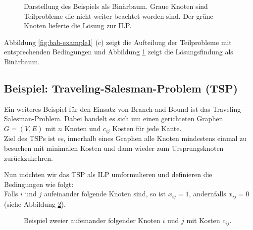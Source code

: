 \documentclass[tog]{acmsiggraph}
\begin{document}
\begin{figure}[ht]
\centering
{}
\caption{Darstellung des Beispiels als Binärbaum. Graue Knoten sind Teilprobleme die nicht weiter beachtet worden sind. Der grüne Knoten lieferte die Lösung zur ILP.}
\label{fig:Branch-And-Bound-Bsp1}
\end{figure}

Abbildung \ref{fig:bab-example1} (c) zeigt die Aufteilung der Teilprobleme mit entsprechenden Bedingungen und Abbildung \ref{fig:Branch-And-Bound-Bsp1} zeigt die Lösungsfindung als Binärbaum.

\subsection*{Beispiel: Traveling-Salesman-Problem (TSP)} 

Ein weiteres Beispiel für den Einsatz von Branch-and-Bound ist das Traveling-Salesman-Problem. Dabei handelt es sich um einen gerichteten Graphen $G = (V,E)$ mit $n$ Knoten und $c_{ij}$ Kosten für jede Kante.\\
Ziel des TSPs ist es, innerhalb eines Graphen alle Knoten mindestens einmal zu besuchen mit minimalen Kosten und dann wieder zum Ursprungsknoten zurückzukehren.

Nun möchten wir das TSP als ILP umformulieren und definieren die Bedingungen wie folgt:\\
Falls $i$ und $j$ aufeinander folgende Knoten sind, so ist $x_{ij} = 1$, andernfalls $x_{ij} = 0$ (siehe Abbildung \ref{fig:tsp-knoten}).

\begin{figure}[ht]
\centering
{}
\caption{Beispiel zweier aufeinander folgender Knoten $i$ und $j$ mit Kosten $c_{ij}$.}
\label{fig:tsp-knoten}
\end{figure}
\end{document}

